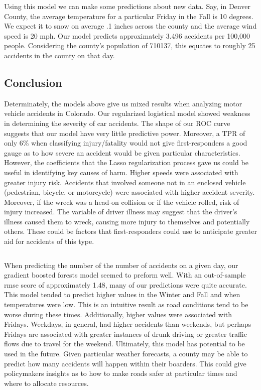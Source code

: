 \documentclass[
]{article}
\begin{document}
\begin{verbatim}
\end{verbatim}

Using this model we can make some predictions about new data. Say, in
Denver County, the average temperature for a particular Friday in the
Fall is 10 degrees. We expect it to snow on average .1 inches across the
county and the average wind speed is 20 mph. Our model predicts
approximately 3.496 accidents per 100,000 people. Considering the
county's population of 710137, this equates to roughly 25 accidents in
the county on that day.

\hypertarget{conclusion}{%
\subsection{Conclusion}\label{conclusion}}

Determinately, the models above give us mixed results when analyzing
motor vehicle accidents in Colorado. Our regularized logistical model
showed weakness in determining the severity of car accidents. The shape
of our ROC curve suggests that our model have very little predictive
power. Moreover, a TPR of only 6\% when classifying injury/fatality
would not give first-responders a good gauge as to how severe an
accident would be given particular characteristics. However, the
coefficients that the Lasso regularization process gave us could be
useful in identifying key causes of harm. Higher speeds were associated
with greater injury risk. Accidents that involved someone not in an
enclosed vehicle (pedestrian, bicycle, or motorcycle) were associated
with higher accident severity. Moreover, if the wreck was a head-on
collision or if the vehicle rolled, risk of injury increased. The
variable of driver illness may suggest that the driver's illness caused
them to wreck, causing more injury to themselves and potentially others.
These could be factors that first-responders could use to anticipate
greater aid for accidents of this type.

\begin{verbatim}
\end{verbatim}

When predicting the number of the number of accidents on a given day,
our gradient boosted forests model seemed to preform well. With an
out-of-sample rmse score of approximately 1.48, many of our predictions
were quite accurate. This model tended to predict higher values in the
Winter and Fall and when temperatures were low. This is an intuitive
result as road conditions tend to be worse during these times.
Additionally, higher values were associated with Fridays. Weekdays, in
general, had higher accidents than weekends, but perhaps Fridays are
associated with greater instances of drunk driving or greater traffic
flows due to travel for the weekend. Ultimately, this model has
potential to be used in the future. Given particular weather forecasts,
a county may be able to predict how many accidents will happen within
their boarders. This could give policymakers insights as to how to make
roads safer at particular times and where to allocate resources.
\end{document}
